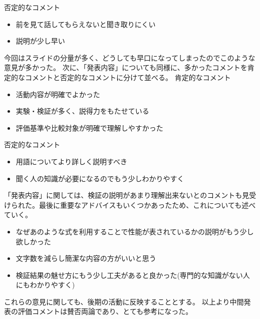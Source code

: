 否定的なコメント
\begin{itemize}
\item 前を見て話してもらえないと聞き取りにくい
\item 説明が少し早い
\end{itemize}

今回はスライドの分量が多く、どうしても早口になってしまったのでこのような意見が多かった。
次に、「発表内容」についても同様に、多かったコメントを肯定的なコメントと否定的なコメントに分けて並べる。
肯定的なコメント
\begin{itemize}
\item 活動内容が明確でよかった
\item 実験・検証が多く、説得力をもたせている
\item 評価基準や比較対象が明確で理解しやすかった
\end{itemize}

否定的なコメント
\begin{itemize}
\item 用語についてより詳しく説明すべき
\item 聞く人の知識が必要になるのでもう少しわかりやすく
\end{itemize}


「発表内容」に関しては、検証の説明があまり理解出来ないとのコメントも見受けられた。最後に重要なアドバイスもいくつかあったため、これについても述べていく。　
\begin{itemize}
\item なぜあのような式を利用することで性能が表されているかの説明がもう少し欲しかった
\item 文字数を減らし簡潔な内容の方がいいと思う
\item 検証結果の魅せ方にもう少し工夫があると良かった(専門的な知識がない人にもわかりやすく)
\end{itemize}
これらの意見に関しても、後期の活動に反映することとする。
以上より中間発表の評価コメントは賛否両論であり、とても参考になった。
